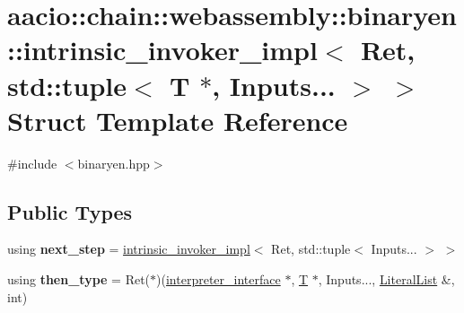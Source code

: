 \hypertarget{structaacio_1_1chain_1_1webassembly_1_1binaryen_1_1intrinsic__invoker__impl_3_01_ret_00_01std_1_f98b15d0d1a47e5a3a760fc9d76f6730}{}\section{aacio\+:\+:chain\+:\+:webassembly\+:\+:binaryen\+:\+:intrinsic\+\_\+invoker\+\_\+impl$<$ Ret, std\+:\+:tuple$<$ T $\ast$, Inputs... $>$ $>$ Struct Template Reference}
\label{structaacio_1_1chain_1_1webassembly_1_1binaryen_1_1intrinsic__invoker__impl_3_01_ret_00_01std_1_f98b15d0d1a47e5a3a760fc9d76f6730}


{\ttfamily \#include $<$binaryen.\+hpp$>$}

\subsection*{Public Types}
\begin{DoxyCompactItemize}
\item 
\mbox{\label{structaacio_1_1chain_1_1webassembly_1_1binaryen_1_1intrinsic__invoker__impl_3_01_ret_00_01std_1_f98b15d0d1a47e5a3a760fc9d76f6730_a869cc90a8c3bfde619d8516adadfb852}} 
using {\bfseries next\+\_\+step} = \mbox{\hyperlink{structaacio_1_1chain_1_1webassembly_1_1binaryen_1_1intrinsic__invoker__impl}{intrinsic\+\_\+invoker\+\_\+impl}}$<$ Ret, std\+::tuple$<$ Inputs... $>$ $>$
\item 
\mbox{\label{structaacio_1_1chain_1_1webassembly_1_1binaryen_1_1intrinsic__invoker__impl_3_01_ret_00_01std_1_f98b15d0d1a47e5a3a760fc9d76f6730_aa93f8efbdf1efac1eeeccd37fd07cfc4}} 
using {\bfseries then\+\_\+type} = Ret($\ast$)(\mbox{\hyperlink{structaacio_1_1chain_1_1webassembly_1_1binaryen_1_1interpreter__interface}{interpreter\+\_\+interface}} $\ast$, \mbox{\hyperlink{struct_t}{T}} $\ast$, Inputs..., \mbox{\hyperlink{classstd_1_1vector}{Literal\+List}} \&, int)
\end{DoxyCompactItemize}
